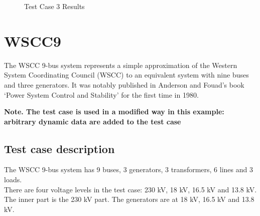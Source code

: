 \documentclass[a4paper, 12pt]{report}
\begin{document}
\begin{figure}[H]
\caption{Test Case 3 Results}
\end{figure}

\chapter{WSCC9}

The WSCC 9-bus system represents a simple approximation of the Western System Coordinating Council (WSCC) to an equivalent system with nine buses and three generators.
It was notably published in Anderson and Fouad’s book ‘Power System Control and Stability’ for the first time in 1980.

\textbf{Note. The test case is used in a modified way in this example: arbitrary dynamic data are added to the test case}

\section{Test case description}

The WSCC 9-bus system has 9 buses, 3 generators, 3 transformers, 6 lines and 3 loads.  \\
There are four voltage levels in the test case: 230 kV, 18 kV, 16.5 kV and 13.8 kV. The inner
part is the 230 kV part. The generators are at 18 kV, 16.5 kV and 13.8 kV.
\end{document}

